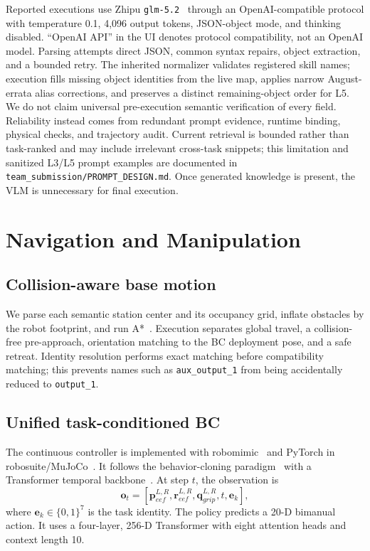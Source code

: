 \documentclass[10pt,twocolumn]{article}
\newcommand{\code}[1]{\texttt{#1}}
\begin{document}
Reported executions use Zhipu \code{glm-5.2}~\citep{glm52docs} through an OpenAI-compatible protocol with temperature 0.1, 4,096 output tokens, JSON-object mode, and thinking disabled. ``OpenAI API'' in the UI denotes protocol compatibility, not an OpenAI model. Parsing attempts direct JSON, common syntax repairs, object extraction, and a bounded retry. The inherited normalizer validates registered skill names; execution fills missing object identities from the live map, applies narrow August-errata alias corrections, and preserves a distinct remaining-object order for L5. We do not claim universal pre-execution semantic verification of every field. Reliability instead comes from redundant prompt evidence, runtime binding, physical checks, and trajectory audit. Current retrieval is bounded rather than task-ranked and may include irrelevant cross-task snippets; this limitation and sanitized L3/L5 prompt examples are documented in \code{team\_submission/PROMPT\_DESIGN.md}. Once generated knowledge is present, the VLM is unnecessary for final execution.

\section{Navigation and Manipulation}

\subsection{Collision-aware base motion}

We parse each semantic station center and its occupancy grid, inflate obstacles by the robot footprint, and run A*~\citep{hart1968astar}. Execution separates global travel, a collision-free pre-approach, orientation matching to the BC deployment pose, and a safe retreat. Identity resolution performs exact matching before compatibility matching; this prevents names such as \code{aux\_output\_1} from being accidentally reduced to \code{output\_1}.

\subsection{Unified task-conditioned BC}

The continuous controller is implemented with robomimic~\citep{mandlekar2022robomimic} and PyTorch in robosuite/MuJoCo~\citep{zhu2020robosuite,todorov2012mujoco}. It follows the behavior-cloning paradigm~\citep{pomerleau1989alvinn} with a Transformer temporal backbone~\citep{vaswani2017attention}. At step $t$, the observation is
\begin{equation}
\mathbf{o}_t = [\mathbf{p}^{L,R}_{eef},\mathbf{r}^{L,R}_{eef},
\mathbf{q}^{L,R}_{grip},t,\mathbf{e}_k],
\end{equation}
where $\mathbf{e}_k\in\{0,1\}^7$ is the task identity. The policy predicts a 20-D bimanual action. It uses a four-layer, 256-D Transformer with eight attention heads and context length 10.
\end{document}
